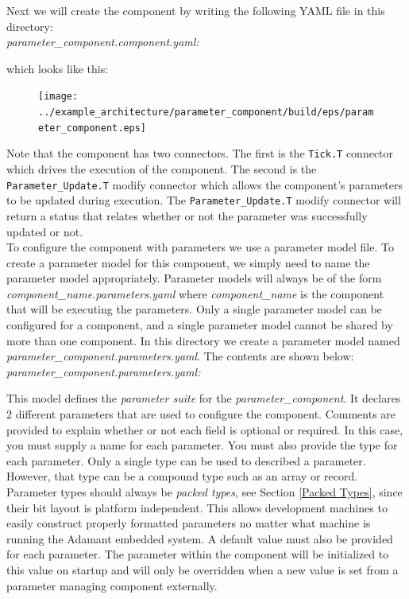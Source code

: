 Next we will create the component by writing the following YAML file in this directory: \\

\textit{parameter\_component.component.yaml:}

which looks like this:

\begin{figure}[H]
  \texttt{[image: ../example\_architecture/parameter\_component/build/eps/parameter\_component.eps]}
\end{figure}

Note that the component has two connectors. The first is the \texttt{Tick.T} connector which drives the execution of the component. The second is the \texttt{Parameter\_Update.T} modify connector which allows the component's parameters to be updated during execution. The \texttt{Parameter\_Update.T} modify connector will return a status that relates whether or not the parameter was successfully updated or not. \\

To configure the component with parameters we use a parameter model file. To create a parameter model for this component, we simply need to name the parameter model appropriately. Parameter models will always be of the form \textit{component\_name.parameters.yaml} where \textit{component\_name} is the component that will be executing the parameters. Only a single parameter model can be configured for a component, and a single parameter model cannot be shared by more than one component. In this directory we create a parameter model named \textit{parameter\_component.parameters.yaml}. The contents are shown below: \\

\textit{parameter\_component.parameters.yaml:}

This model defines the \textit{parameter suite} for the \textit{parameter\_component}. It declares 2 different parameters that are used to configure the component. Comments are provided to explain whether or not each field is optional or required. In this case, you must supply a name for each parameter. You must also provide the type for each parameter. Only a single type can be used to described a parameter. However, that type can be a compound type such as an array or record. Parameter types should always be \textit{packed types}, see Section \ref{Packed Types}, since their bit layout is platform independent. This allows development machines to easily construct properly formatted parameters no matter what machine is running the Adamant embedded system. A default value must also be provided for each parameter. The parameter within the component will be initialized to this value on startup and will only be overridden when a new value is set from a parameter managing component externally. \\

